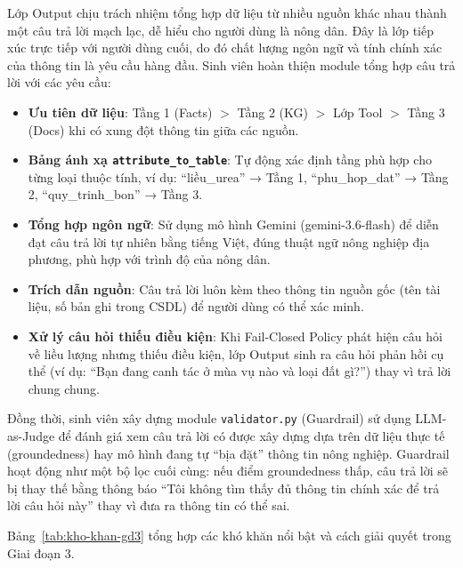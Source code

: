 Lớp Output chịu trách nhiệm tổng hợp dữ liệu từ nhiều nguồn khác nhau thành một câu trả lời mạch lạc, dễ hiểu cho người dùng là nông dân. Đây là lớp tiếp xúc trực tiếp với người dùng cuối, do đó chất lượng ngôn ngữ và tính chính xác của thông tin là yêu cầu hàng đầu. Sinh viên hoàn thiện module tổng hợp câu trả lời với các yêu cầu:

\begin{itemize}
    \item \textbf{Ưu tiên dữ liệu}: Tầng 1 (Facts) $>$ Tầng 2 (KG) $>$ Lớp Tool $>$ Tầng 3 (Docs) khi có xung đột thông tin giữa các nguồn.
    \item \textbf{Bảng ánh xạ \texttt{attribute\_to\_table}}: Tự động xác định tầng phù hợp cho từng loại thuộc tính, ví dụ: ``liều\_urea'' → Tầng 1, ``phu\_hop\_dat'' → Tầng 2, ``quy\_trinh\_bon'' → Tầng 3.
    \item \textbf{Tổng hợp ngôn ngữ}: Sử dụng mô hình Gemini (gemini-3.6-flash) để diễn đạt câu trả lời tự nhiên bằng tiếng Việt, đúng thuật ngữ nông nghiệp địa phương, phù hợp với trình độ của nông dân.
    \item \textbf{Trích dẫn nguồn}: Câu trả lời luôn kèm theo thông tin nguồn gốc (tên tài liệu, số bản ghi trong CSDL) để người dùng có thể xác minh.
    \item \textbf{Xử lý câu hỏi thiếu điều kiện}: Khi Fail-Closed Policy phát hiện câu hỏi về liều lượng nhưng thiếu điều kiện, lớp Output sinh ra câu hỏi phản hồi cụ thể (ví dụ: ``Bạn đang canh tác ở mùa vụ nào và loại đất gì?'') thay vì trả lời chung chung.
\end{itemize}

Đồng thời, sinh viên xây dựng module \texttt{validator.py} (Guardrail) sử dụng LLM-as-Judge để đánh giá xem câu trả lời có được xây dựng dựa trên dữ liệu thực tế (groundedness) hay mô hình đang tự ``bịa đặt'' thông tin nông nghiệp. Guardrail hoạt động như một bộ lọc cuối cùng: nếu điểm groundedness thấp, câu trả lời sẽ bị thay thế bằng thông báo ``Tôi không tìm thấy đủ thông tin chính xác để trả lời câu hỏi này'' thay vì đưa ra thông tin có thể sai.

Bảng~\ref{tab:kho-khan-gd3} tổng hợp các khó khăn nổi bật và cách giải quyết trong Giai đoạn 3.

